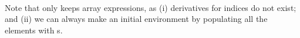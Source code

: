 \begin{code}%
%
\>[2]\AgdaSpace{}%
\AgdaSymbol{:}\AgdaSpace{}%
\AgdaSpace{}%
\AgdaSpace{}%
\AgdaSpace{}%
\AgdaSpace{}%
\<%
\\
%
\>[2]\AgdaSpace{}%
%
\>[18]%
\>[21]\AgdaSymbol{=}\AgdaSpace{}%
\<%
\\
%
\>[2]\AgdaSpace{}%
\AgdaSymbol{(}\AgdaSpace{}%
\AgdaSpace{}%
\AgdaSpace{}%
\AgdaSymbol{)}%
\>[18]%
\>[21]\AgdaSymbol{=}\AgdaSpace{}%
\AgdaSpace{}%
\AgdaSpace{}%
\AgdaSpace{}%
\AgdaSpace{}%
\AgdaSpace{}%
\AgdaSpace{}%
\AgdaSymbol{(}\AgdaSpace{}%
\AgdaSymbol{)}\<%
\\
%
\>[2]\AgdaSpace{}%
\AgdaSymbol{(}\AgdaSpace{}%
\AgdaSpace{}%
\AgdaSpace{}%
\AgdaSymbol{)}%
\>[18]%
\>[21]\AgdaSymbol{=}\AgdaSpace{}%
\AgdaSpace{}%
\AgdaSpace{}%
\<%
\end{code}
Note that  only keeps array expressions, as (i) derivatives for indices do
not exist; and (ii) we can always make an initial environment by populating all the
elements with s.  

